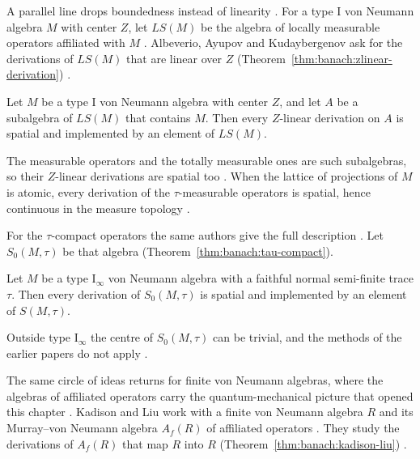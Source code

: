 A parallel line drops boundedness instead of linearity
\cite[p.~1]{AlbeverioAyupovKudaybergenov2007}. For a type I von Neumann
algebra $M$ with center $Z$, let $LS(M)$ be the algebra of locally measurable
operators affiliated with $M$ \cite[p.~1]{AlbeverioAyupovKudaybergenov2007}.
Albeverio, Ayupov and Kudaybergenov ask for the derivations of $LS(M)$ that
are linear over $Z$ (Theorem~\ref{thm:banach:zlinear-derivation})
\cite[p.~1]{AlbeverioAyupovKudaybergenov2007}.\begin{theorem}\label{thm:banach:zlinear-derivation}
Let $M$ be a type I von Neumann algebra with center $Z$, and let $A$ be a
subalgebra of $LS(M)$ that contains $M$. Then every $Z$-linear derivation on
$A$ is spatial and implemented by an element of $LS(M)$. \end{theorem}

The measurable operators and the totally measurable ones are such
subalgebras, so their $Z$-linear derivations are spatial too
\cite[Corollary~3.10, p.~11]{AlbeverioAyupovKudaybergenov2007}. When the
lattice of projections of $M$ is atomic, every derivation of the
$\tau$-measurable operators is spatial, hence continuous in the measure
topology \cite[Corollary~3.11, p.~11]{AlbeverioAyupovKudaybergenov2007}.

For the $\tau$-compact operators the same authors give the full description
\cite[p.~1]{AlbeverioAyupovKudaybergenovKalandarov2008}. Let $S_{0}(M,\tau)$
be that algebra (Theorem~\ref{thm:banach:tau-compact}).

\begin{theorem}\label{thm:banach:tau-compact}
Let $M$ be a type $\mathrm{I}_\infty$ von Neumann algebra with a faithful
normal semi-finite trace $\tau$. Then every derivation of $S_{0}(M,\tau)$ is
spatial and implemented by an element of $S(M,\tau)$.
\end{theorem}

Outside type $\mathrm{I}_\infty$ the centre of $S_{0}(M,\tau)$ can be
trivial, and the methods of the earlier papers do not apply
\cite[p.~10]{AlbeverioAyupovKudaybergenovKalandarov2008}.

The same circle of ideas returns for finite von Neumann algebras, where the
algebras of affiliated operators carry the quantum-mechanical picture that
opened this chapter \cite[p.~2087]{KadisonLiu2014Murray}. Kadison and Liu work
with a finite von Neumann algebra $R$ and its Murray--von Neumann algebra
$A_f(R)$ of affiliated operators \cite[p.~2089]{KadisonLiu2014Murray}. They
study the derivations of $A_f(R)$ that map $R$ into $R$
(Theorem~\ref{thm:banach:kadison-liu}) \cite[p.~2089]{KadisonLiu2014Murray}.

